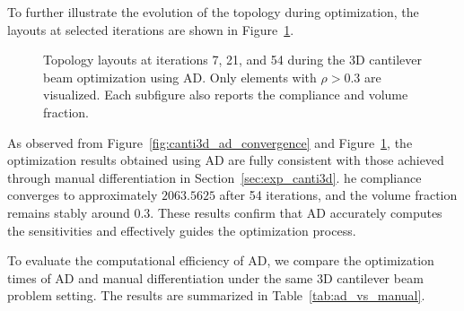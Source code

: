 \documentclass[mathpazo]{cicp}
\begin{document}
To further illustrate the evolution of the topology during optimization, the layouts at selected iterations are shown in Figure~\ref{fig:canti3d_ad_topos}.

\begin{figure}[htp]
	\centering
	\caption{Topology layouts at iterations 7, 21, and 54 during the 3D cantilever beam optimization using AD. Only elements with $\rho>0.3$ are visualized. Each subfigure also reports the compliance and volume fraction.}
	\label{fig:canti3d_ad_topos}
\end{figure}

As observed from Figure~\ref{fig:canti3d_ad_convergence} and Figure~\ref{fig:canti3d_ad_topos}, the optimization results obtained using AD are fully consistent with those achieved through manual differentiation in Section~\ref{sec:exp_canti3d}. he compliance converges to approximately $2063.5625$ after 54 iterations, and the volume fraction remains stably around $0.3$. These results confirm that AD accurately computes the sensitivities and effectively guides the optimization process.

To evaluate the computational efficiency of AD, we compare the optimization times of AD and manual differentiation under the same 3D cantilever beam problem setting. The results are summarized in Table~\ref{tab:ad_vs_manual}.
\end{document}
